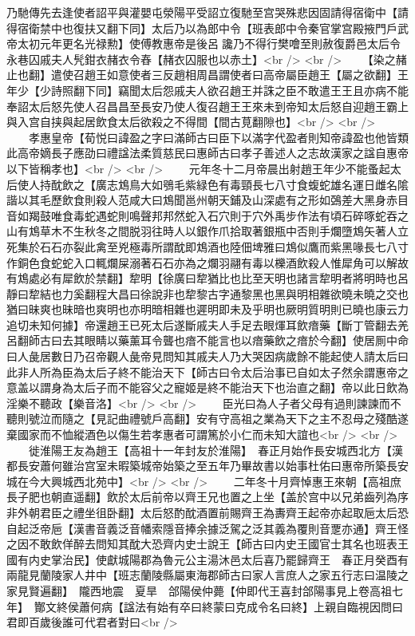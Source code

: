 乃馳傳先去逢使者詔平與灌嬰屯滎陽平受詔立復馳至宫哭殊悲因固請得宿衛中【請得宿衛禁中也復扶又翻下同】太后乃以為郎中令【班表郎中令秦官掌宫殿掖門戶武帝太初元年更名光禄勲】使傅教惠帝是後呂讒乃不得行樊噲至則赦復爵邑太后令永巷囚戚夫人髠鉗衣赭衣令舂【赭衣囚服也以赤土】<br />
<br />
　　【染之赭止也翻】遣使召趙王如意使者三反趙相周昌謂使者曰高帝屬臣趙王【屬之欲翻】王年少【少詩照翻下同】竊聞太后怨戚夫人欲召趙王并誅之臣不敢遣王王且亦病不能奉詔太后怒先使人召昌昌至長安乃使人復召趙王王來未到帝知太后怒自迎趙王霸上與入宫自挟與起居飲食太后欲殺之不得間【間古莧翻隙也】<br />
<br />
　　孝惠皇帝【荀悦曰諱盈之字曰滿師古曰臣下以滿字代盈者則知帝諱盈也他皆類此高帝嫡長子應劭曰禮諡法柔質慈民曰惠師古曰孝子善述人之志故漢家之諡自惠帝以下皆稱孝也】<br />
<br />
　　元年冬十二月帝晨出射趙王年少不能蚤起太后使人持酖飲之【廣志鴆鳥大如鴞毛紫緑色有毒頸長七八寸食蝮蛇雄名運日雌名隂諧以其毛歷飲食則殺人范咸大曰鴆聞邕州朝天鋪及山深處有之形如鵶差大黑身赤目音如羯鼓唯食毒蛇遇蛇則鳴聲邦邦然蛇入石穴則于穴外禹步作法有頃石碎啄蛇吞之山有鴆草木不生秋冬之間脱羽往時人以銀作爪拾取著銀瓶中否則手爛墮鴆矢著人立死集於石石亦裂此禽至兇極毒所謂酖即鴆酒也陸佃埤雅曰鴆似鷹而紫黑喙長七八寸作銅色食蛇蛇入口輒爛屎溺著石石亦為之爛羽翮有毒以櫟酒飲殺人惟犀角可以解故有鴆處必有犀飲於禁翻】犂明【徐廣曰犂猶比也比至天明也諸言犂明者將明時也呂靜曰犂結也力奚翻程大昌曰徐說非也犂黎古字通黎黑也黑與明相雜欲曉未曉之交也猶曰昧爽也昧暗也爽明也亦明暗相雜也遲明即未及乎明也厥明質明則已曉也康云力追切未知何據】帝還趙王已死太后遂斷戚夫人手足去眼煇耳飲瘖藥【斷丁管翻去羌呂翻師古曰去其眼睛以藥薰耳令聾也瘖不能言也以瘖藥飲之瘖於今翻】使居厠中命曰人彘居數日乃召帝觀人彘帝見問知其戚夫人乃大哭因病歲餘不能起使人請太后曰此非人所為臣為太后子終不能治天下【師古曰令太后治事已自如太子然余謂惠帝之意盖以謂身為太后子而不能容父之寵姬是終不能治天下也治直之翻】帝以此日飲為淫樂不聽政【樂音洛】<br />
<br />
　　臣光曰為人子者父母有過則諫諫而不聽則號泣而隨之【見記曲禮號戶高翻】安有守高祖之業為天下之主不忍母之殘酷遂棄國家而不恤縱酒色以傷生若孝惠者可謂篤於小仁而未知大誼也<br />
<br />
　　徙淮陽王友為趙王【高祖十一年封友於淮陽】　春正月始作長安城西北方【漢都長安蕭何雖治宫室未暇築城帝始築之至五年乃畢故書以始事杜佑曰惠帝所築長安城在今大興城西北苑中】<br />
<br />
　　二年冬十月齊悼惠王來朝【高祖庶長子肥也朝直遥翻】飲於太后前帝以齊王兄也置之上坐【盖於宫中以兄弟齒列為序非外朝君臣之禮坐徂卧翻】太后怒酌酖酒置前賜齊王為夀齊王起帝亦起取巵太后恐自起泛帝巵【漢書音義泛音幡索隱音捧余據泛駕之泛其義為覆則音覂亦通】齊王怪之因不敢飲佯醉去問知其酖大恐齊内史士說王【師古曰内史王國官士其名也班表王國有内史掌治民】使獻城陽郡為魯元公主湯沐邑太后喜乃罷歸齊王　春正月癸酉有兩龍見蘭陵家人井中【班志蘭陵縣屬東海郡師古曰家人言庶人之家五行志曰温陵之家見賢遍翻】　隴西地震　夏旱　郃陽侯仲薨【仲即代王喜封郃陽事見上卷高祖七年】　酇文終侯蕭何病【諡法有始有卒曰終蒙曰克成令名曰終】上親自臨視因問曰君即百歲後誰可代君者對曰<br />
